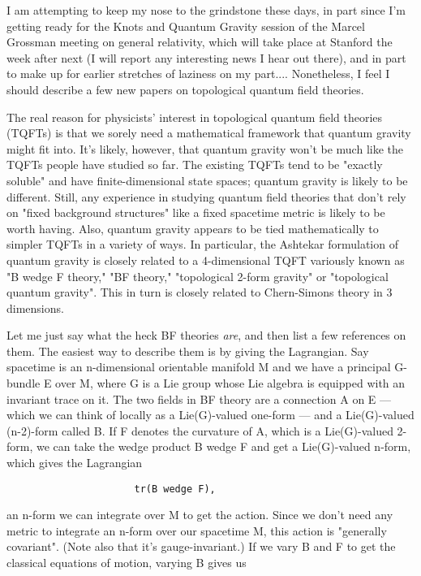 

I am attempting to keep my nose to the grindstone these days, in part
since I'm getting ready for the Knots and Quantum Gravity session of
the Marcel Grossman meeting on general relativity, which will take place at
Stanford the week after next (I will report any interesting news I hear
out there), and in part to make up for earlier stretches of laziness on
my part....  Nonetheless, I feel I should describe a few new papers on
topological quantum field theories.

The real reason for physicists' interest in topological quantum field
theories (TQFTs) is that we sorely need a mathematical framework that
quantum gravity might fit into.  It's likely, however, that quantum
gravity won't be much like the TQFTs people have studied so far.  The
existing TQFTs tend to be "exactly soluble" and have finite-dimensional
state spaces; quantum gravity is likely to be different.  Still, any
experience in studying quantum field theories that don't rely on "fixed
background structures" like a fixed spacetime metric is likely to be
worth having.  Also, quantum gravity appears to be tied mathematically
to simpler TQFTs in a variety of ways.  In particular, the Ashtekar
formulation of quantum gravity is closely related to a 4-dimensional
TQFT variously known as "B wedge F theory," "BF theory," "topological
2-form gravity" or "topological quantum gravity".  This in turn is
closely related to Chern-Simons theory in 3 dimensions.

Let me just say what the heck BF theories \emph{are}, and then list a few
references on them.  The easiest way to describe them is by giving the
Lagrangian.  Say spacetime is an n-dimensional orientable manifold M and
we have a principal G-bundle E over M, where G is a Lie group whose Lie
algebra is equipped with an invariant trace on it.  The two fields in BF
theory are a connection A on E --- which we can think of locally as a
Lie(G)-valued one-form --- and a Lie(G)-valued (n-2)-form called B.  If
F denotes the curvature of A, which is a Lie(G)-valued 2-form, we can
take the wedge product B wedge F and get a Lie(G)-valued n-form, which
gives the Lagrangian

\begin{verbatim}
                      tr(B wedge F),
\end{verbatim}
    

an n-form we can integrate over M to get the action.  Since we don't
need any metric to integrate an n-form over our spacetime M, this action
is "generally covariant".  (Note also that it's gauge-invariant.)  If we
vary B and F to get the classical equations of motion, varying B gives us

